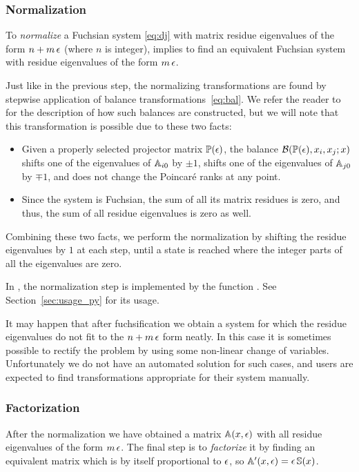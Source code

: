 \documentclass[12pt,a4paper]{article}
\begin{document}
\subsubsection{Normalization}
\label{sec:norm}

To \textit{normalize} a Fuchsian system \eqref{eq:dj} with matrix residue eigenvalues of the form $n+m\,\epsilon$ (where $n$ is integer), implies to find an equivalent Fuchsian system with residue eigenvalues of the form $m\,\epsilon$.

Just like in the previous step, the normalizing transformations are found by stepwise application of balance transformations~\eqref{eq:bal}.
We refer the reader to~\cite[p.~11]{Lee15} for the description of how such balances are constructed, but we will note that this transformation is possible due to these two facts:
\begin{itemize}
    \item Given a properly selected projector matrix $\mathbb{P}(\epsilon)$, the balance $\mathcal{B}(\mathbb{P}(\epsilon), x_i, x_j; x)$ shifts one of the eigenvalues of $\mathbb{A}_{i0}$ by $\pm1$, shifts one of the eigenvalues of $\mathbb{A}_{j0}$ by $\mp1$, and does not change the Poincar\'e ranks at any point.
    \item Since the system is Fuchsian, the sum of all its matrix residues is zero, and thus, the sum of all residue eigenvalues is zero as well.
\end{itemize}
Combining these two facts, we perform the normalization by shifting the residue eigenvalues by $1$ at each step, until a state is reached where the integer parts of all the eigenvalues are zero.

In \fuchsia, the normalization step is implemented by the function .
See Section~\ref{sec:usage_py} for its usage.

It may happen that after fuchsification we obtain a system for which the residue eigenvalues do not fit to the $n+m\,\epsilon$ form neatly.
In this case it is sometimes possible to rectify the problem by using some non-linear change of variables.
Unfortunately we do not have an automated solution for such cases, and users are expected to find transformations appropriate for their system manually.


\subsubsection{Factorization}
\label{sec:fact}
After the normalization we have obtained a matrix $\mathbb{A}(x,\epsilon)$ with all residue eigenvalues of the form $m\,\epsilon$.
The final step is to \textit{factorize} it by finding an equivalent matrix which is by itself proportional to $\epsilon$, so $\mathbb{A}'(x,\epsilon)=\epsilon\,\mathbb{S}(x)$.
\end{document}

